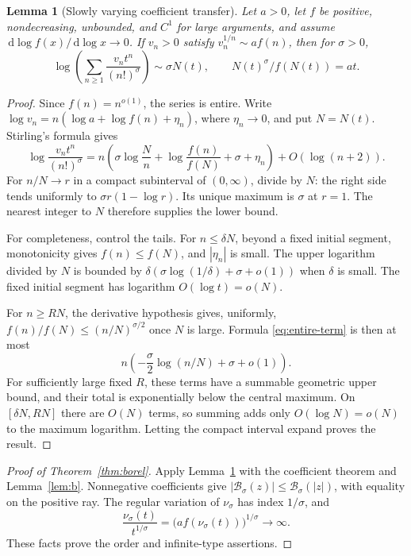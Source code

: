 \documentclass[11pt,a4paper]{article}
\numberwithin{equation}{section}
\newtheorem{lemma}[theorem]{Lemma}
\theoremstyle{definition}
\theoremstyle{remark}
\newcommand{\Bcal}{\mathcal B}
\newcommand{\dd}{\,\mathrm d}
\begin{document}
\begin{lemma}[Slowly varying coefficient transfer]
\label{lem:entire-transfer}
Let $a>0$, let $f$ be positive, nondecreasing, unbounded, and $C^1$ for
large arguments, and assume
$\dd\log f(x)/\dd\log x\to0$. If $v_n>0$ satisfy
$v_n^{1/n}\sim af(n)$, then for $\sigma>0$,
\[
 \log\left(\sum_{n\ge1}\frac{v_nt^n}{(n!)^\sigma}\right)
 \sim\sigma N(t),\qquad N(t)^\sigma/f(N(t))=at.
\]
\end{lemma}
\begin{proof}
Since $f(n)=n^{o(1)}$, the series is entire. Write
$\log v_n=n(\log a+\log f(n)+\eta_n)$, where $\eta_n\to0$, and
put $N=N(t)$. Stirling's formula gives
\begin{equation}
 \log\frac{v_nt^n}{(n!)^\sigma}
 =n\left(\sigma\log\frac Nn+
          \log\frac{f(n)}{f(N)}+\sigma+\eta_n\right)+O(\log(n+2)).
 \label{eq:entire-term}
\end{equation}
For $n/N\to r$ in a compact subinterval of $(0,\infty)$, divide by $N$:
the right side tends uniformly to $\sigma r(1-\log r)$.
Its unique maximum is $\sigma$ at $r=1$. The nearest integer to $N$
therefore supplies the lower bound.

For completeness, control the tails. For $n\le\delta N$, beyond a fixed
initial segment, monotonicity gives $f(n)\le f(N)$, and $|\eta_n|$ is
small. The upper logarithm divided by $N$ is bounded by
$\delta(\sigma\log(1/\delta)+\sigma+o(1))$ when $\delta$ is small.
The fixed initial segment has logarithm $O(\log t)=o(N)$.

For $n\ge RN$, the derivative hypothesis gives, uniformly,
$f(n)/f(N)\le(n/N)^{\sigma/2}$ once $N$ is large. Formula
\eqref{eq:entire-term} is then at most
\[
 n\left(-\frac\sigma2\log(n/N)+\sigma+o(1)\right).
\]
For sufficiently large fixed $R$, these terms have a summable
geometric upper bound, and their total is exponentially below the
central maximum. On $[\delta N,RN]$ there are $O(N)$ terms, so summing
adds only $O(\log N)=o(N)$ to the maximum logarithm. Letting the compact
interval expand proves the result.
\end{proof}

\begin{proof}[Proof of Theorem~\ref{thm:borel}]
Apply Lemma~\ref{lem:entire-transfer} with the coefficient theorem and
Lemma~\ref{lem:b}. Nonnegative coefficients give
$|\Bcal_\sigma(z)|\le\Bcal_\sigma(|z|)$, with equality on the positive
ray. The regular variation of $\nu_\sigma$ has index $1/\sigma$, and
\[
 \frac{\nu_\sigma(t)}{t^{1/\sigma}}
   =\bigl(a f(\nu_\sigma(t))\bigr)^{1/\sigma}\longrightarrow\infty.
\]
These facts prove the order and infinite-type assertions.
\end{proof}
\end{document}
